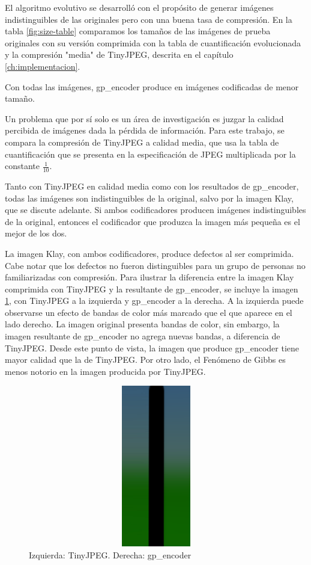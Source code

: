 El algoritmo evolutivo se desarrolló con el propósito de generar imágenes
indistinguibles de las originales pero con una buena tasa de compresión. En la
tabla \ref{fig:size-table} comparamos los tamaños de las imágenes de prueba
originales con su versión comprimida con la tabla de cuantificación
evolucionada y la compresión "media" de TinyJPEG, descrita en el capítulo
\ref{ch:implementacion}.

Con todas las imágenes, gp\_encoder produce en imágenes codificadas de menor
tamaño.

Un problema que por sí solo es un área de investigación \cite{subjective-paper}
es juzgar la calidad percibida de imágenes dada la pérdida de información. Para
este trabajo, se compara la compresión de TinyJPEG a calidad media, que usa la
tabla de cuantificación que se presenta en la especificación de JPEG
multiplicada por la constante $\frac{1}{10}$.

Tanto con TinyJPEG en calidad media como con los resultados de gp\_encoder,
todas las imágenes son indistinguibles de la original, salvo por la imagen
Klay, que se discute adelante. Si ambos codificadores producen imágenes
indistinguibles de la original, entonces el codificador que produzca la imagen más
pequeña es el mejor de los dos.

La imagen Klay, con ambos codificadores, produce defectos al ser comprimida.
Cabe notar que los defectos no fueron distinguibles para un grupo de personas
no familiarizadas con compresión. Para ilustrar la diferencia entre la
imagen Klay comprimida con TinyJPEG y la resultante de gp\_encoder, se incluye
la imagen \ref{img:banding}, con TinyJPEG a la izquierda y gp\_encoder a la
derecha. A la izquierda puede observarse un efecto de bandas de color más
marcado que el que aparece en el lado derecho. La imagen original presenta bandas de
color, sin embargo, la imagen resultante de gp\_encoder no agrega nuevas
bandas, a diferencia de TinyJPEG. Desde este punto de vista, la imagen que
produce gp\_encoder tiene mayor calidad que la de TinyJPEG. Por otro lado, el
Fenómeno de Gibbs es menos notorio en la imagen producida por TinyJPEG.

\begin{figure}
    \includegraphics[width=400pt, height=200pt]{banding}
    \caption{Izquierda: TinyJPEG. Derecha: gp\_encoder}
    \label{img:banding}
\end{figure}

